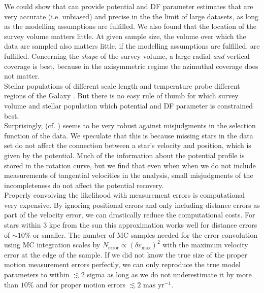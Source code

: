 We could show that \RM{} can provide potential and DF parameter estimates that are very accurate (i.e. unbiased) and precise in the the limit of large datasets, as long as the modelling assumptions are fulfilled. We also found that the location of the survey volume matters little. At given sample size, the volume over which the data are sampled also matters little, if the modelling assumptions are fulfilled.
are fulfilled. Concerning the \emph{shape} of the survey volume, a large radial \emph{and} vertical coverage is best, because in the axisymmetric regime the azimuthal coverage does not matter.
\\Stellar populations of different scale length and temperature probe different regions of the Galaxy \citep{2013ApJ...779..115B}. But there is no easy rule of thumb for which survey volume and stellar population which potential and DF parameter is constrained best.\\
Surprisingly, (cf. \citealt{2013A&ARv..21...61R}) \RM{} seems to be very robust against misjudgments in the selection function of the data. We speculate that this is because missing stars in the data set do not affect the connection between a star's velocity and position, which is given by the potential. Much of the information about the potential profile is stored in the rotation curve, but we find that even when when we do not include measurements of tangential velocities in the analysis, small misjudgments of the incompleteness do not affect the potential recovery.\\

 Properly convolving the likelihood with measurement errors is computational very expensive. By ignoring positional errors and only including distance errors as part of the velocity error, we can drastically reduce the computational costs. For stars within 3 kpc from the sun this approximation works well for distance errors of $\sim 10\%$ or smaller. The number of MC samples needed for the error convolution using MC integration scales by $N_\text{error} \propto (\delta v_\text{max})^2$ with the maximum velocity error at the edge of the sample. If we did not know the true size of the proper motion measurement errors perfectly, we can only reproduce the true model parameters to within $\lesssim 2$ sigma \Wilma{[TO DO: Check???]} as long as we do not underestimate it by more than $10\%$ and for proper motion errors $\lesssim 2 \text{ mas yr}^{-1}$.\\

